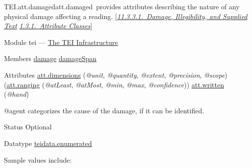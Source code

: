 \begin{reflist}
\item[]\begin{specHead}{TEI.att.damaged}{att.damaged} provides attributes describing the nature of any physical damage affecting a reading. [\textit{\hyperref[PHDA]{11.3.3.1.\ Damage, Illegibility, and Supplied Text}} \textit{\hyperref[STECAT]{1.3.1.\ Attribute Classes}}]\end{specHead} 
    \item[{Module}]
  tei — \hyperref[ST]{The TEI Infrastructure}
    \item[{Members}]
  \hyperref[TEI.damage]{damage} \hyperref[TEI.damageSpan]{damageSpan}
    \item[{Attributes}]
  \hyperref[TEI.att.dimensions]{att.dimensions} (\textit{@unit}, \textit{@quantity}, \textit{@extent}, \textit{@precision}, \textit{@scope})  (\hyperref[TEI.att.ranging]{att.ranging} (\textit{@atLeast}, \textit{@atMost}, \textit{@min}, \textit{@max}, \textit{@confidence})) \hyperref[TEI.att.written]{att.written} (\textit{@hand}) \hfil\\[-10pt]\begin{sansreflist}
    \item[@agent]
  categorizes the cause of the damage, if it can be identified.
\begin{reflist}
    \item[{Status}]
  Optional
    \item[{Datatype}]
  \hyperref[TEI.teidata.enumerated]{teidata.enumerated}
    \item[{Sample values include:}]
  \begin{description}


\end{description}
\end{reflist}
\end{sansreflist}
\end{reflist}
